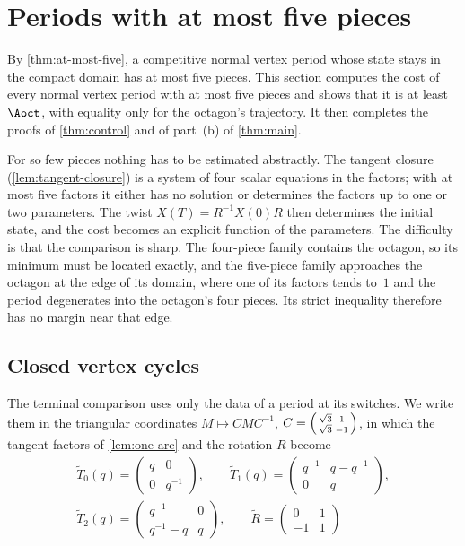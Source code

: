 \section{Periods with at most five pieces}\label{sec:terminal}

By \cref{thm:at-most-five}, a competitive normal vertex period whose state stays in the compact
domain has at most five pieces. This section computes the cost of every normal vertex period with
at most five pieces and shows that it is at least $\Aoct$, with equality only for the octagon's
trajectory. It then completes the proofs of \cref{thm:control} and of part~(b) of
\cref{thm:main}.

For so few pieces nothing has to be estimated abstractly. The tangent closure
(\cref{lem:tangent-closure}) is a system of four scalar equations in the factors; with at most
five factors it either has no solution or determines the factors up to one or two parameters.
The twist $X(T)=R^{-1}X(0)R$ then determines the initial state, and the cost becomes an explicit
function of the parameters. The difficulty is that the comparison is sharp. The four-piece
family contains the octagon, so its minimum must be located exactly, and the five-piece family
approaches the octagon at the edge of its domain, where one of its factors tends to~$1$ and the
period degenerates into the octagon's four pieces. Its strict inequality therefore has no margin
near that edge.

\subsection{Closed vertex cycles}\label{sec:terminal-cycles}

The terminal comparison uses only the data of a period at its switches. We write them in the
triangular coordinates $M\mapsto CMC^{-1}$,
$C=\begin{psmallmatrix}\sqrt3&1\\\sqrt3&-1\end{psmallmatrix}$, in which the tangent factors of
\cref{lem:one-arc} and the rotation $R$ become
\begin{equation}\label{eq:term-tri}
\begin{gathered}
 \widetilde T_0(q)=\begin{pmatrix}q&0\\0&q^{-1}\end{pmatrix},\qquad
 \widetilde T_1(q)=\begin{pmatrix}q^{-1}&q-q^{-1}\\0&q\end{pmatrix},\\
 \widetilde T_2(q)=\begin{pmatrix}q^{-1}&0\\q^{-1}-q&q\end{pmatrix},\qquad
 \widetilde R=\begin{pmatrix}0&1\\-1&1\end{pmatrix}
\end{gathered}
\end{equation}


